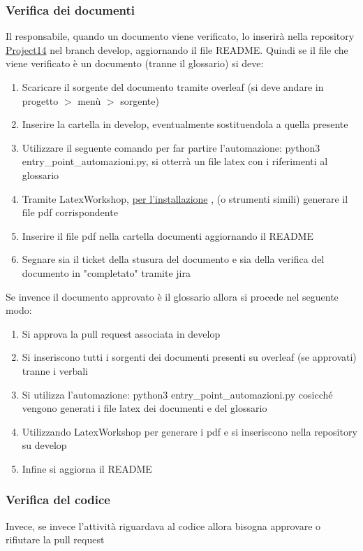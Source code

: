 \subsubsection{Verifica dei documenti}
Il responsabile, quando un documento viene verificato, lo inserirà nella repository \href{https://github.com/RAMtastic6/Project14}{Project14} nel branch develop, aggiornando il file README.
Quindi se il file che viene verificato è un documento (tranne il glossario) si deve:
\begin{enumerate}
    \item Scaricare il sorgente del documento tramite overleaf (si deve andare in progetto $>$ menù $>$ sorgente)
    \item Inserire la cartella in develop, eventualmente sostituendola a quella presente
    \item Utilizzare il seguente comando per far partire l'automazione: python3 entry\_point\_automazioni.py, si otterrà un file latex con i riferimenti al glossario
    \item Tramite LatexWorkshop, \href{https://github.com/James-Yu/LaTeX-Workshop/wiki/Install}{per l'installazione} , (o strumenti simili) generare il file pdf corrispondente
    \item Inserire il file pdf nella cartella documenti aggiornando il README
    \item Segnare sia il ticket della stusura del documento e sia della verifica del documento in "completato" tramite jira
\end{enumerate}
Se invence il documento approvato è il glossario allora si procede nel seguente modo:
\begin{enumerate}
    \item Si approva la pull request associata in develop
    \item Si inseriscono tutti i sorgenti dei documenti presenti su overleaf (se approvati) tranne i verbali
    \item Si utilizza l'automazione: python3 entry\_point\_automazioni.py
    cosicché vengono generati i file latex dei documenti e del glossario
    \item Utilizzando LatexWorkshop per generare i pdf e si inseriscono nella repository su develop
    \item Infine si aggiorna il README
\end{enumerate}
\subsubsection{Verifica del codice}
Invece, se invece l'attività riguardava al codice allora bisogna approvare o rifiutare la pull request
